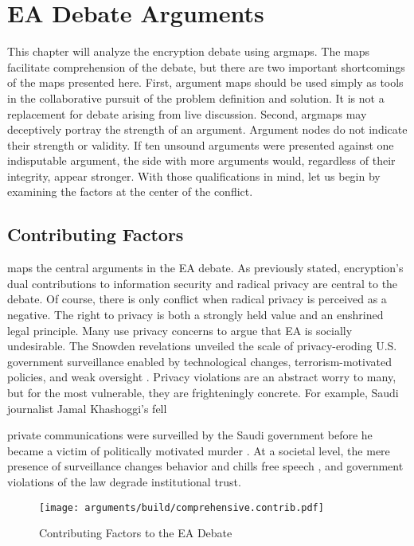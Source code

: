\chapter{EA Debate Arguments}
\label{chap-arguments}

This chapter will analyze the \ac{encryption} debate using \acp{argmap}. The maps facilitate comprehension of the
debate, but there are two important shortcomings of the maps presented here. First, argument maps should be used simply
as tools in the collaborative pursuit of the problem definition and solution. It is not a replacement for debate arising
from live discussion. Second, \acp{argmap} may deceptively portray the strength of an argument. Argument nodes do not
indicate their strength or validity. If ten unsound arguments were presented against one indisputable argument, the side
with more arguments would, regardless of their integrity, appear stronger. With those qualifications in mind, let us
begin by examining the factors at the center of the conflict.


\section{Contributing Factors}
\label{sed-arg-contrib}

 maps the central arguments in the EA debate. As previously stated, \ac{encryption}'s dual
contributions to information security and radical privacy are central to the debate. Of course, there is only conflict
when radical privacy is perceived as a negative. The right to privacy is both a strongly held value and an enshrined
legal principle. Many use privacy concerns to argue that \ac{EA} is socially undesirable. The Snowden revelations
\cite{landau_making_2013} unveiled the scale of privacy-eroding U.S. government surveillance enabled by technological
changes, terrorism-motivated policies, and weak oversight \cite{shamsi_2011}. Privacy violations are an abstract worry
to many, but for the most vulnerable, they are frighteningly concrete. For example, Saudi journalist Jamal Khashoggi's
fell

private communications were surveilled by the Saudi government before he became a victim of politically motivated murder
\cite{liebermann_2019}. At a societal level, the mere presence of surveillance changes behavior and chills free speech
\cite{rogaway_moral_2015}, and government violations of the law degrade institutional trust.

\begin{sidewaysfigure}
  \centering\CaptionFontSize
  \texttt{[image: arguments/build/comprehensive.contrib.pdf]}
  \caption{Contributing Factors to the EA Debate}
  \label{fig-args-contrib}
\end{sidewaysfigure}

